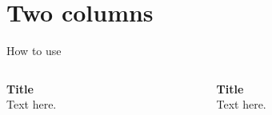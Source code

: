 \section{Two columns}

\begin{frame}{How to use}
    \begin{columns}
        \centering
        \begin{column}{0.4\textwidth}
            \textbf{Title} \\
            \small
            Text here.

        \end{column}
        \begin{column}{0.5\textwidth}
            \textbf{Title} \\
            \small
            Text here.
        \end{column}
    \end{columns}
\end{frame}
